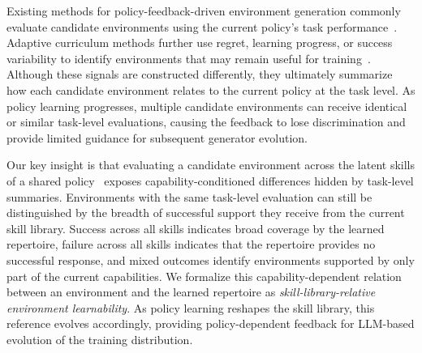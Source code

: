 \documentclass[conference]{IEEEtran}
\begin{document}
Existing methods for policy-feedback-driven environment generation commonly
evaluate candidate environments using the current policy's task
performance~\cite{eurekaverse,envgen,curricullm}. Adaptive curriculum methods
further use regret, learning progress, or success variability to identify
environments that may remain useful for
training~\cite{paired,jiang2021plr,sfl}. Although these signals are constructed
differently, they ultimately summarize how each candidate environment relates
to the current policy at the task level. As policy learning progresses,
multiple candidate environments can receive identical or similar task-level
evaluations, causing the feedback to lose discrimination and provide limited
guidance for subsequent generator evolution.

Our key insight is that evaluating a candidate environment across the latent
skills of a shared policy~\cite{divo} exposes capability-conditioned differences
hidden by task-level summaries. Environments with the same task-level
evaluation can still be distinguished by the breadth of successful support they
receive from the current skill library. Success across all skills indicates
broad coverage by the learned repertoire, failure across all skills indicates
that the repertoire provides no successful response, and mixed outcomes
identify environments supported by only part of the current capabilities. We
formalize this capability-dependent relation between an environment and the
learned repertoire as \emph{skill-library-relative environment learnability}.
As policy learning reshapes the skill library, this reference evolves
accordingly, providing policy-dependent feedback for LLM-based evolution of the
training distribution.
\end{document}
